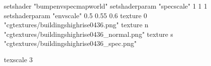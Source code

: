 setshader "bumpenvspecmapworld"
setshaderparam "specscale" 1 1 1
setshaderparam "envscale"  0.5 0.55 0.6
   texture 0 "cgtextures/buildingshighrise0436.png"
   texture n "cgtextures/buildingshighrise0436_normal.png"
   texture s "cgtextures/buildingshighrise0436_spec.png"

texscale 3